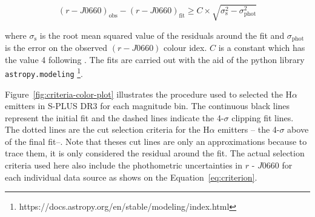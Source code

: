 \documentclass[fleqn,usenatbib]{mnras}
\begin{document}
\begin{equation}
  (r - J0660)_{\mathrm{obs}} - (r - J0660)_{\mathrm{fit}} \geq C \times \sqrt{\sigma^2_{\mathrm{s}} - \sigma^2_{\mathrm{phot}}}
  \label{eq:criterion}
\end{equation}
 
 where $\sigma_{\mathrm{s}}$ is the root mean squared value of the residuals around
 the fit and $\sigma_{\mathrm{phot}}$ is the error on the observed $(r - J0660)$ colour idex.
 $C$ is a constant which has the value 4 following \citet{Wevers:2017}.
The fits are carried out with the aid of the python library \texttt{astropy.modeling}
\footnote{https://docs.astropy.org/en/stable/modeling/index.html}.

Figure~\ref{fig:criteria-color-plot} illustrates the procedure used to selected the H{$\alpha$}
emitters in S-PLUS DR3 for each magnitude bin. The continuous black lines represent the initial
fit and  the dashed lines indicate the 4-$\sigma$ clipping fit lines. The dotted lines are
the cut selection criteria for the H{$\alpha$} emitters -- the 4-$\sigma$ above of the final
fit--. Note that theses cut lines are only an approximations because to trace them,
it is only considered the residual around the fit. The actual selection criteria used here
also include the phothometric uncertainties in $r$ - $J$0660 for each individual data source as
shows on the Equation~\ref{eq:criterion}.
\end{document}
